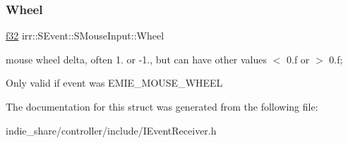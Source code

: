 \subsubsection{\texorpdfstring{Wheel}{Wheel}}
{\footnotesize\ttfamily \hyperlink{namespaceirr_a0277be98d67dc26ff93b1a6a1d086b07}{f32} irr\+::\+S\+Event\+::\+S\+Mouse\+Input\+::\+Wheel}



mouse wheel delta, often 1. or -\/1., but can have other values $<$ 0.\+f or $>$ 0.\+f; 

Only valid if event was E\+M\+I\+E\+\_\+\+M\+O\+U\+S\+E\+\_\+\+W\+H\+E\+EL 

The documentation for this struct was generated from the following file\+:\begin{DoxyCompactItemize}
\item 
indie\+\_\+share/controller/include/I\+Event\+Receiver.\+h\end{DoxyCompactItemize}
